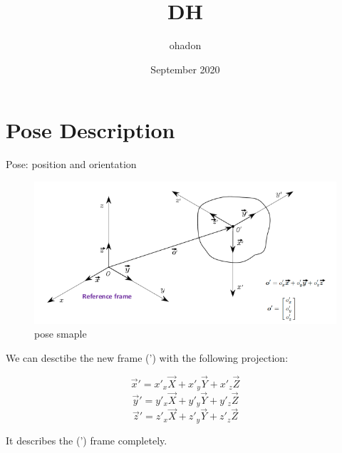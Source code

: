 \documentclass{article}
\title{DH}
\author{ohadon }
\date{September 2020}
\begin{document}
\section{Pose Description}
Pose: position and orientation
\begin{figure}[h!]
\centering
\includegraphics[scale=1.5]{pose.png}
\caption{pose smaple}
\label{fig:sr}
\end{figure}

We can desctibe the new frame (') with the following projection:

 $$\vec{x}{'}= x{'}_{x}\vec{X} + x{'}_{y}\vec{Y}  + x{'}_{z}\vec{Z}$$
 $$\vec{y}{'}= y{'}_{x}\vec{X} + y{'}_{y}\vec{Y}  + y{'}_{z}\vec{Z}$$
 $$\vec{z}{'}= z{'}_{x}\vec{X} + z{'}_{y}\vec{Y}  + z{'}_{z}\vec{Z}$$

It describes the (') frame completely.
\end{document}
